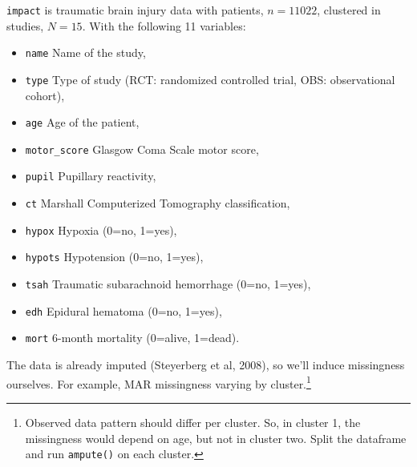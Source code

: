 \documentclass[
]{jss}
\providecommand{\tightlist}{%
  \setlength{\itemsep}{0pt}\setlength{\parskip}{0pt}}
\begin{document}
\texttt{impact} is traumatic brain injury data with patients,
\(n = 11022\), clustered in studies, \(N = 15\). With the following 11
variables:

\begin{itemize}
\tightlist
\item
  \texttt{name} Name of the study,
\item
  \texttt{type} Type of study (RCT: randomized controlled trial, OBS:
  observational cohort),
\item
  \texttt{age} Age of the patient,
\item
  \texttt{motor\_score} Glasgow Coma Scale motor score,
\item
  \texttt{pupil} Pupillary reactivity,
\item
  \texttt{ct} Marshall Computerized Tomography classification,
\item
  \texttt{hypox} Hypoxia (0=no, 1=yes),
\item
  \texttt{hypots} Hypotension (0=no, 1=yes),
\item
  \texttt{tsah} Traumatic subarachnoid hemorrhage (0=no, 1=yes),
\item
  \texttt{edh} Epidural hematoma (0=no, 1=yes),
\item
  \texttt{mort} 6-month mortality (0=alive, 1=dead).
\end{itemize}

The data is already imputed (Steyerberg et al, 2008), so we'll induce
missingness ourselves. For example, MAR missingness varying by
cluster.\footnote{Observed data pattern should differ per cluster. So,
  in cluster 1, the missingness would depend on age, but not in cluster
  two. Split the dataframe and run \texttt{ampute()} on each cluster.}
\end{document}
